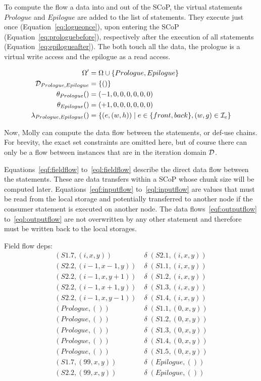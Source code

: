 \documentclass{sigplanconf}
\newcommand{\Stmt}{\Omega} \newcommand{\Field}{{\cal F}}
\newcommand{\Dom}{{\cal D}}
\newcommand{\Idx}{{\cal I}}
\begin{document}
To compute the flow a data into and out of the SCoP, the virtual statements $Prologue$ and $Epilogue$ are added to the list of statements. They execute just once (Equation~\ref{eq:logueonce}), upon entering the SCoP (Equation~\ref{eq:prologuebefore}), respectively after the execution of all statements (Equation~\ref{eq:epilogueafter}). The both touch all the data, the prologue is a virtual write access and the epilogue as a read access.

\begin{align}
  \Stmt' &= \Stmt \cup \{ Prologue, Epilogue \} \notag\\
  \Dom_{Prologue,Epilogue} &= \{ () \} \label{eq:logueonce}\\
  \theta_{Prologue}() &= (-1,0,0,0,0,0,0) \label{eq:prologuebefore}\\
  \theta_{Epilogue}() &= (+1,0,0,0,0,0,0) \label{eq:epilogueafter}\\
  \lambda_{Prologue,Epilogue}() &= \left\{ (e,(w,h)) \;\middle|\; e \in \{front, back\}, (w,g) \in \Idx_e \right\} \notag
\end{align}


Now, Molly can compute the data flow between the statements, or def-use chains. For brevity, the exact set constraints are omitted here, but of course there can only be a flow between instances that are in the iteration domain $\Dom$.

Equations~\ref{eqf:fieldflow} to~\ref{eql:fieldflow} describe the direct data flow between the statements. These are data transfers within a SCoP whose chunk size will be computed later. Equations~\ref{eqf:inputflow} to~\ref{eql:inputflow} are values that must be read from the local storage and potentially transferred to another node if the consumer statement is executed on another node. The data flows~\ref{eqf:outputflow} to~\ref{eql:outputflow} are not overwritten by any other statement and therefore must be written back to the local storages.
 
\newcommand*{\flow}{\;\delta\;}
Field flow deps:
\begin{align}
  (S1.7,(i,x,y)) &\flow (S2.1,(i,x,y)) \label{eqf:fieldflow} \\
  (S2.2,(i-1,x-1,y)) &\flow (S1.1,(i,x,y)) \label{eqf:fieldflowex}\\
  (S2.2,(i-1,x,y+1)) &\flow (S1.2,(i,x,y))\\
  (S2.2,(i-1,x+1,y)) &\flow (S1.3,(i,x,y))\\
  (S2.2,(i-1,x,y-1)) &\flow (S1.4,(i,x,y)) \label{eql:fieldflow} \\
(Prologue,()) &\flow (S1.1,(0,x,y)) \label{eqf:inputflow}\\
  (Prologue,()) &\flow (S1.2,(0,x,y))\\
  (Prologue,()) &\flow (S1.3,(0,x,y))\\
  (Prologue,()) &\flow (S1.4,(0,x,y))\\
  (Prologue,()) &\flow (S1.5,(0,x,y)) \label{eql:inputflow}\\
  (S1.7,(99,x,y)) &\flow (Epilogue,()) \label{eqf:outputflow}\\
  (S2.2,(99,x,y)) &\flow (Epilogue,()) \label{eql:outputflow}
\end{align}
\end{document}
